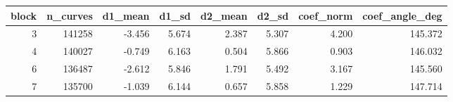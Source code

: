 \begin{tabular}{rrrrrrrr}
\toprule
block & n_curves & d1_mean & d1_sd & d2_mean & d2_sd & coef_norm & coef_angle_deg \\
\midrule
3 & 141258 & -3.456 & 5.674 & 2.387 & 5.307 & 4.200 & 145.372 \\
4 & 140027 & -0.749 & 6.163 & 0.504 & 5.866 & 0.903 & 146.032 \\
6 & 136487 & -2.612 & 5.846 & 1.791 & 5.492 & 3.167 & 145.560 \\
7 & 135700 & -1.039 & 6.144 & 0.657 & 5.858 & 1.229 & 147.714 \\
\bottomrule
\end{tabular}
